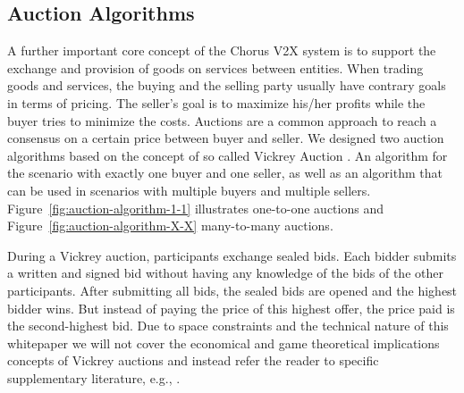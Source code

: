 \documentclass{llncs}
\begin{document}
{		\subsection{Auction Algorithms}
			\label{ss:auchtion-algorithm}				

			A further important core concept of the Chorus V2X system is to support the exchange and provision of goods on services between entities. When trading goods and services, the buying and the selling party usually have contrary goals in terms of pricing. The seller's goal is to maximize his/her profits while the buyer tries to minimize the costs. Auctions are a common approach to reach a consensus on a certain price between buyer and seller. We designed two auction algorithms based on the concept of so called Vickrey Auction \cite{moldovanu1998goethe}\cite{vickrey1961counterspeculation}. An algorithm for the scenario with exactly one buyer and one seller, as well as an algorithm that can be used in scenarios with multiple buyers and multiple sellers. Figure~\ref{fig:auction-algorithm-1-1} illustrates one-to-one auctions and Figure~\ref{fig:auction-algorithm-X-X} many-to-many auctions.
			
			During a Vickrey auction, participants exchange sealed bids. Each bidder submits a written and signed bid without having any knowledge of the bids of the other participants. After submitting all bids, the sealed bids are opened and the highest bidder wins. But instead of paying the price of this highest offer, the price paid is the second-highest bid. Due to space constraints and the technical nature of this whitepaper we will not cover the economical and game theoretical implications concepts of Vickrey auctions and instead refer the reader to specific supplementary literature, e.g., \cite{ausubel2006lovely}\cite{edelman2007internet}\cite{lucking2000vickrey}\cite{moldovanu1998goethe}\cite{vickrey1961counterspeculation}.

}
\end{document}
